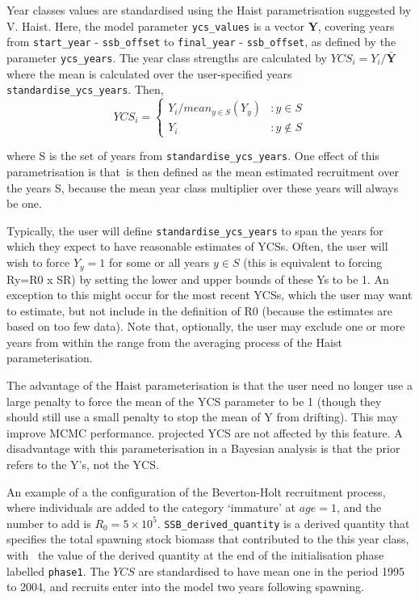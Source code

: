 Year classes values are standardised using the Haist parametrisation suggested by V. Haist. Here, the model parameter \texttt{ycs\_values} is a vector \textbf{Y}, covering years from \texttt{start\_year} - \texttt{ssb\_offset} to \texttt{final\_year} - \texttt{ssb\_offset}, as defined by the parameter \texttt{ycs\_years}. The year class strengths are calculated by $YCS_i=Y_i/\bar{\textbf{Y}}$ where the mean is calculated over the user-specified years \texttt{standardise\_ycs\_years}. Then,
\[
YCS_i = 
\begin{cases}
Y_i / mean_{y \in S}(Y_y) & :y \in S\\
Y_i					 & :y \notin S
\end{cases}
\]

where S is the set of years from \texttt{standardise\_ycs\_years}. One effect of this parametrisation is that\Rzero\ is then defined as the mean estimated recruitment over the years S, because the mean year class multiplier over these years will always be one.

Typically, the user will define \texttt{standardise\_ycs\_years} to span the years for which they expect to have reasonable estimates of YCSs. Often, the user will wish to force $Y_y=1$ for some or all years $y\in S$ (this is equivalent to forcing Ry=R0 x SR) by setting the lower and upper bounds of these Ys to be 1. An exception to this might occur for the most recent YCSs, which the user may want to estimate, but not include in the definition of R0 (because the estimates are based on too few data). Note that, optionally, the user may exclude one or more years from within the range from the averaging process of the Haist parameterisation. 

The advantage of the Haist parameterisation is that the user need no longer use a large penalty to force the mean of the YCS parameter to be 1 (though they should still use a small penalty to stop the mean of Y from drifting). This may improve MCMC performance.  projected YCS are not affected by this feature. A disadvantage with this parameterisation in a Bayesian analysis is that the prior refers to the Y’s, not the YCS.

An example of a the configuration of the Beverton-Holt recruitment process, where individuals are added to the category `immature' at $age=1$, and the number to add is $R_0=5 \times 10^5$. \texttt{SSB\_derived\_quantity} is a derived quantity that specifies the total spawning stock biomass that contributed to the this year class, with \Bzero\ the value of the derived quantity at the end of the initialisation phase labelled \texttt{phase1}. The $YCS$ are standardised to have mean one in the period 1995 to 2004, and recruits enter into the model two years following spawning.


